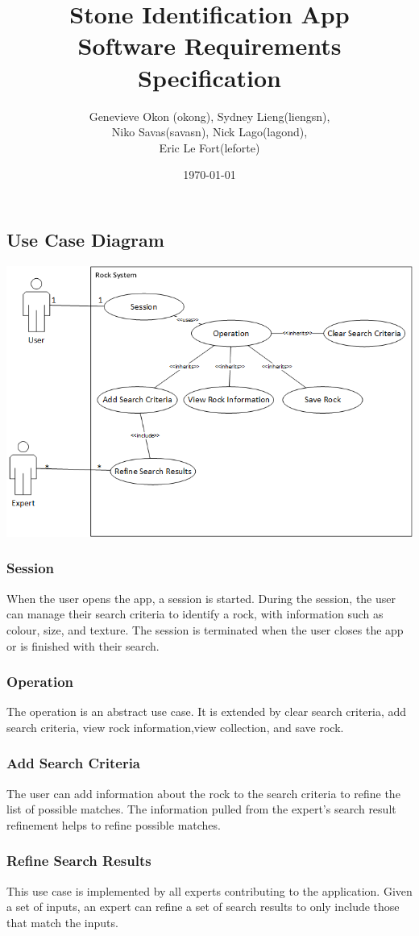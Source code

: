 \documentclass[titlepage]{article}
\title{Stone Identification App \\
  Software Requirements Specification}
\author{Genevieve Okon (okong), Sydney Lieng(liengsn),\\
  Niko Savas(savasn), Nick Lago(lagond),\\
  Eric Le Fort(leforte)}
\date{\today}
\begin{document}
\maketitle
\newpage

\subsection{Use Case Diagram}

  \includegraphics[scale = 0.65]{../resources/UseCaseDiagram.png}
  \subsubsection{Session}
    When the user opens the app, a session is started. During the session, the user can manage their search criteria to identify a rock, with information such as colour, size, and texture. The session is terminated when the user closes the app or is finished with their search.
  \subsubsection{Operation}
    The operation is an abstract use case. It is extended by clear search criteria, add search criteria, view rock information,view collection, and save rock.
  \subsubsection{Add Search Criteria}
    The user can add information about the rock to the search criteria to refine the list of possible matches. The information pulled from the expert's search result refinement helps to refine possible matches.
  \subsubsection{Refine Search Results}
    This use case is implemented by all experts contributing to the application. Given a set of inputs, an expert can refine a set of search results to only include those that match the inputs.
\end{document}
